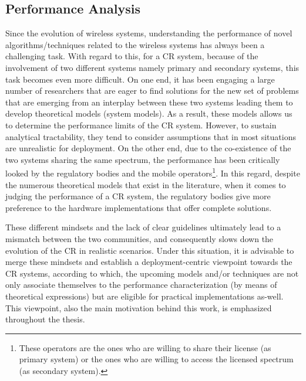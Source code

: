 \subsection{Performance Analysis}
Since the evolution of wireless systems, understanding the performance of novel algorithms/techniques related to the wireless systems has always been a challenging task. With regard to this, for a CR system, because of the involvement of two different systems namely primary and secondary systems, this task becomes even more difficult. On one end, it has been engaging a large number of researchers that are eager to find solutions for the new set of problems that are emerging from an interplay between these two systems leading them to develop theoretical models (system models). As a result, these models allows us to determine the performance limits of the CR system. However, to sustain analytical tractability, they tend to consider assumptions that in most situations are unrealistic for deployment.  %
 On the other end, due to the co-existence of the two systems sharing the same spectrum, the performance has been critically looked by the regulatory bodies and the mobile operators\footnote{These operators are the ones who are willing to share their license (as primary system) or the ones who are willing to access the licensed spectrum (as secondary system).}. In this regard, despite the numerous theoretical models that exist in the literature, when it comes to judging the performance of a CR system, the regulatory bodies give more preference to the hardware implementations that offer complete solutions. 

These different mindsets and the lack of clear guidelines ultimately lead to a mismatch between the two communities, and consequently slows down the evolution of the CR in realistic scenarios. Under this situation, it is advisable to merge these mindsets and establish a deployment-centric viewpoint towards the CR systems, according to which, the upcoming models and/or techniques are not only associate themselves to the performance characterization (by means of theoretical expressions) but are eligible for practical implementations as-well. This viewpoint, also the main motivation behind this work, is emphasized throughout the thesis. 


